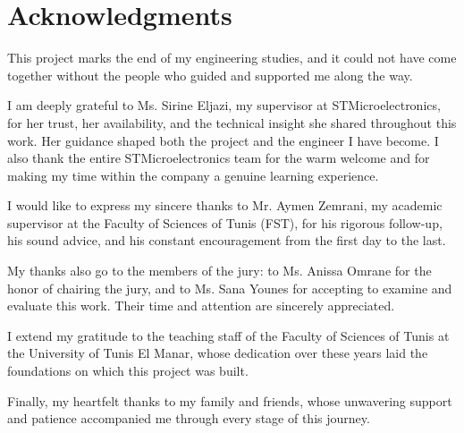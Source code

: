 \chapter*{Acknowledgments}

This project marks the end of my engineering studies, and it could not have
come together without the people who guided and supported me along the way.

I am deeply grateful to Ms. Sirine Eljazi, my supervisor at STMicroelectronics,
for her trust, her availability, and the technical insight she shared throughout
this work. Her guidance shaped both the project and the engineer I have become.
I also thank the entire STMicroelectronics team for the warm welcome and for
making my time within the company a genuine learning experience.

I would like to express my sincere thanks to Mr. Aymen Zemrani, my academic
supervisor at the Faculty of Sciences of Tunis (FST), for his rigorous
follow-up, his sound advice, and his constant encouragement from the first day
to the last.

My thanks also go to the members of the jury: to Ms. Anissa Omrane for the
honor of chairing the jury, and to Ms. Sana Younes for accepting to examine
and evaluate this work. Their time and attention are sincerely appreciated.

I extend my gratitude to the teaching staff of the Faculty of Sciences of
Tunis at the University of Tunis El Manar, whose dedication over these years
laid the foundations on which this project was built.

Finally, my heartfelt thanks to my family and friends, whose unwavering
support and patience accompanied me through every stage of this journey.